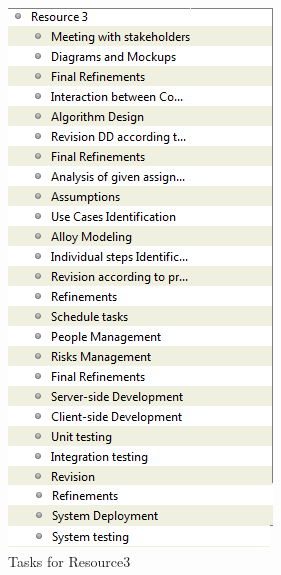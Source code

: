 	\begin{figure}[h]
		\includegraphics[scale=0.55]{img/Resource3.png}
		\caption{Tasks for Resource3}
	\end{figure}
\FloatBarrier
